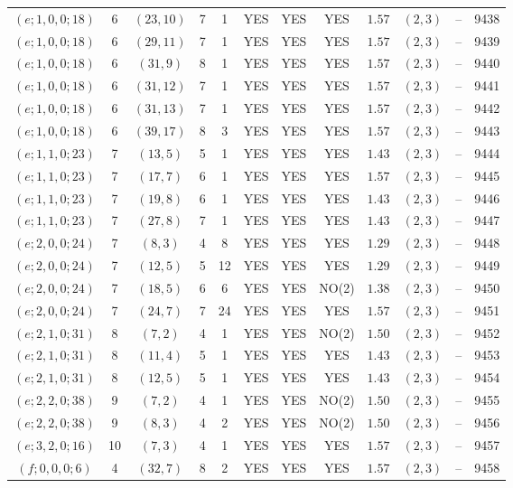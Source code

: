 \begin{longtable}{|c|c|c|c|c|c|c|c|c|c|c|c|}
$(e;1,0,0;18)$ & 6 & $(23,10)$ & 7 & 1 & YES & YES & YES & $1.57$ & $(2,3)$ & -- & 9438\\
$(e;1,0,0;18)$ & 6 & $(29,11)$ & 7 & 1 & YES & YES & YES & $1.57$ & $(2,3)$ & -- & 9439\\
$(e;1,0,0;18)$ & 6 & $(31,9)$ & 8 & 1 & YES & YES & YES & $1.57$ & $(2,3)$ & -- & 9440\\
$(e;1,0,0;18)$ & 6 & $(31,12)$ & 7 & 1 & YES & YES & YES & $1.57$ & $(2,3)$ & -- & 9441\\
$(e;1,0,0;18)$ & 6 & $(31,13)$ & 7 & 1 & YES & YES & YES & $1.57$ & $(2,3)$ & -- & 9442\\
$(e;1,0,0;18)$ & 6 & $(39,17)$ & 8 & 3 & YES & YES & YES & $1.57$ & $(2,3)$ & -- & 9443\\
$(e;1,1,0;23)$ & 7 & $(13,5)$ & 5 & 1 & YES & YES & YES & $1.43$ & $(2,3)$ & -- & 9444\\
$(e;1,1,0;23)$ & 7 & $(17,7)$ & 6 & 1 & YES & YES & YES & $1.57$ & $(2,3)$ & -- & 9445\\
$(e;1,1,0;23)$ & 7 & $(19,8)$ & 6 & 1 & YES & YES & YES & $1.43$ & $(2,3)$ & -- & 9446\\
$(e;1,1,0;23)$ & 7 & $(27,8)$ & 7 & 1 & YES & YES & YES & $1.43$ & $(2,3)$ & -- & 9447\\
$(e;2,0,0;24)$ & 7 & $(8,3)$ & 4 & 8 & YES & YES & YES & $1.29$ & $(2,3)$ & -- & 9448\\
$(e;2,0,0;24)$ & 7 & $(12,5)$ & 5 & 12 & YES & YES & YES & $1.29$ & $(2,3)$ & -- & 9449\\
$(e;2,0,0;24)$ & 7 & $(18,5)$ & 6 & 6 & YES & YES & NO(2) & $1.38$ & $(2,3)$ & -- & 9450\\
$(e;2,0,0;24)$ & 7 & $(24,7)$ & 7 & 24 & YES & YES & YES & $1.57$ & $(2,3)$ & -- & 9451\\
$(e;2,1,0;31)$ & 8 & $(7,2)$ & 4 & 1 & YES & YES & NO(2) & $1.50$ & $(2,3)$ & -- & 9452\\
$(e;2,1,0;31)$ & 8 & $(11,4)$ & 5 & 1 & YES & YES & YES & $1.43$ & $(2,3)$ & -- & 9453\\
$(e;2,1,0;31)$ & 8 & $(12,5)$ & 5 & 1 & YES & YES & YES & $1.43$ & $(2,3)$ & -- & 9454\\
$(e;2,2,0;38)$ & 9 & $(7,2)$ & 4 & 1 & YES & YES & NO(2) & $1.50$ & $(2,3)$ & -- & 9455\\
$(e;2,2,0;38)$ & 9 & $(8,3)$ & 4 & 2 & YES & YES & NO(2) & $1.50$ & $(2,3)$ & -- & 9456\\
$(e;3,2,0;16)$ & 10 & $(7,3)$ & 4 & 1 & YES & YES & YES & $1.57$ & $(2,3)$ & -- & 9457\\
$(f;0,0,0;6)$ & 4 & $(32,7)$ & 8 & 2 & YES & YES & YES & $1.57$ & $(2,3)$ & -- & 9458\\

\end{longtable}
